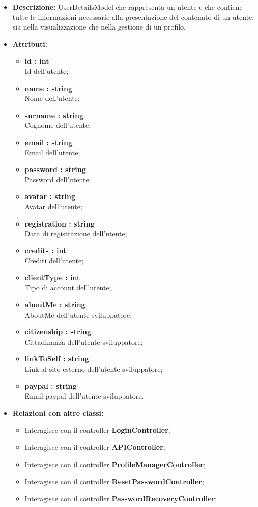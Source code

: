 \begin{itemize}
	\item \textbf{Descrizione:} UserDetailsModel che rappresenta un utente e che contiene tutte le informazioni
necessarie alla presentazione del contenuto di un utente, sia nella visualizzazione che nella gestione di un profilo.
	\item \textbf{Attributi:}
		\begin{itemize}
			\item \textbf{id : int}\\
			Id dell'utente;
			\item \textbf{name : string}\\
			Nome dell'utente;
			\item \textbf{surname : string}\\
			Cognome dell'utente;
			\item \textbf{email : string}\\
			Email dell'utente;
			\item \textbf{password : string}\\
			Password dell'utente;
			\item \textbf{avatar : string}\\
			Avatar dell'utente;
			\item \textbf{registration : string}\\
			Data di registrazione dell'utente;
			\item \textbf{credits : int}\\
			Crediti dell'utente;
			\item \textbf{clientType : int}\\
			Tipo di account dell'utente;
			\item \textbf{aboutMe : string}\\
			AboutMe dell'utente sviluppatore;
			\item \textbf{citizenship : string}\\
			Cittadinanza dell'utente sviluppatore;
			\item \textbf{linkToSelf : string}\\
			Link al sito esterno dell'utente sviluppatore;
			\item \textbf{paypal : string}\\
			Email paypal dell'utente sviluppatore.
		\end{itemize}
	\item \textbf{Relazioni con altre classi:}
		\begin{itemize}
			\item Interagisce con il controller \textbf{LoginController};
			\item Interagisce con il controller \textbf{APIController};
			\item Interagisce con il controller \textbf{ProfileManagerController};
			\item Interagisce con il controller \textbf{ResetPasswordController};
			\item Interagisce con il controller \textbf{PasswordRecoveryController};
	\end{itemize}
\end{itemize}

